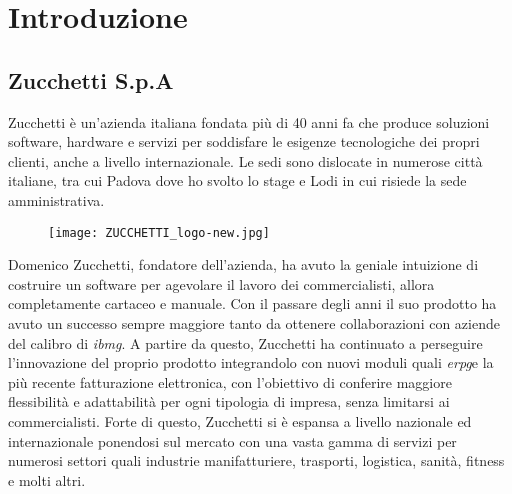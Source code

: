 
\chapter{Introduzione}
\label{cap:introduzione}





\section{Zucchetti S.p.A}
Zucchetti è un'azienda italiana fondata più di 40 anni fa che produce soluzioni software, hardware e servizi per soddisfare le esigenze tecnologiche dei propri clienti, anche a livello internazionale. Le sedi sono dislocate in numerose città italiane, tra cui Padova dove ho svolto lo stage e Lodi in cui risiede la sede amministrativa.


\begin{figure}[htbp]
	\begin{center}
		\texttt{[image: ZUCCHETTI\_logo-new.jpg]}
	\end{center}
\end{figure}

Domenico Zucchetti, fondatore dell'azienda, ha avuto la geniale intuizione di costruire un software per agevolare il lavoro dei commercialisti, allora completamente cartaceo e manuale. Con il passare degli anni il suo prodotto ha avuto un successo sempre maggiore tanto da ottenere collaborazioni con aziende del calibro di \emph{\gls{ibmg}}\glsfirstoccur. A partire da questo, Zucchetti ha continuato a perseguire l'innovazione del proprio prodotto integrandolo con nuovi moduli quali \emph{\gls{erpg}}\glsfirstoccur e la più recente fatturazione elettronica, con l'obiettivo di conferire maggiore flessibilità e adattabilità per ogni tipologia di impresa, senza limitarsi ai commercialisti. Forte di questo, Zucchetti si è espansa a livello nazionale ed internazionale ponendosi sul mercato con una vasta gamma di servizi per numerosi settori quali industrie manifatturiere, trasporti, logistica, sanità, fitness e molti altri. \\


